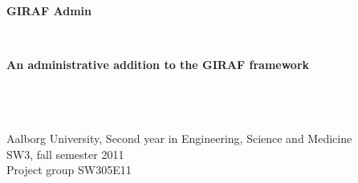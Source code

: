 \thispagestyle{empty}
\begin{center}
	\hrulefill\newline
	\\
	\begin{LARGE}	
	\textbf{GIRAF Admin}
	\end{LARGE}
	\\
	\begin{large} 
	\textbf{An administrative addition to the GIRAF framework}
	\end{large}\\
	\hrulefill\newline
	\\~\\
	Aalborg University, Second year in Engineering, Science and Medicine\\
	SW3, fall semester 2011	\\
	Project group SW305E11\\
\end{center}